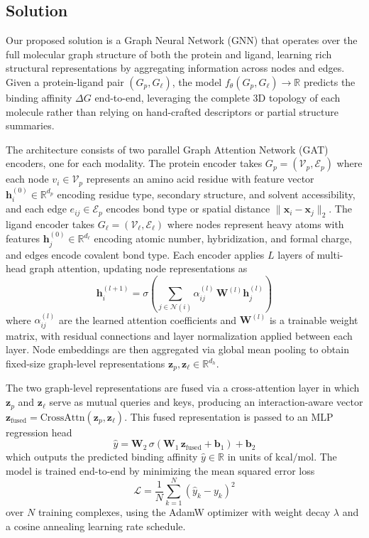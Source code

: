 \documentclass[conference]{IEEEtran}
\begin{document}
\subsection{Solution}\label{AA}
Our proposed solution is a Graph Neural Network (GNN) that operates over the full molecular graph structure of both the protein and ligand, learning rich structural representations by aggregating information across nodes and edges. Given a protein-ligand pair $(G_p, G_\ell)$, the model $f_\theta(G_p, G_\ell) \to \mathbb{R}$ predicts the binding affinity $\Delta G$ end-to-end, leveraging the complete 3D topology of each molecule rather than relying on hand-crafted descriptors or partial structure summaries.

The architecture consists of two parallel Graph Attention Network (GAT) encoders, one for each modality. The protein encoder takes $G_p = (\mathcal{V}_p, \mathcal{E}_p)$ where each node $v_i \in \mathcal{V}_p$ represents an amino acid residue with feature vector $\mathbf{h}_i^{(0)} \in \mathbb{R}^{d_p}$ encoding residue type, secondary structure, and solvent accessibility, and each edge $e_{ij} \in \mathcal{E}_p$ encodes bond type or spatial distance $\|\mathbf{x}_i - \mathbf{x}_j\|_2$. The ligand encoder takes $G_\ell = (\mathcal{V}_\ell, \mathcal{E}_\ell)$ where nodes represent heavy atoms with features $\mathbf{h}_j^{(0)} \in \mathbb{R}^{d_\ell}$ encoding atomic number, hybridization, and formal charge, and edges encode covalent bond type. Each encoder applies $L$ layers of multi-head graph attention, updating node representations as
\begin{equation}
    \mathbf{h}_i^{(l+1)} = \sigma\!\left(\sum_{j \in \mathcal{N}(i)} \alpha_{ij}^{(l)}\, \mathbf{W}^{(l)} \mathbf{h}_j^{(l)}\right)
\end{equation}
where $\alpha_{ij}^{(l)}$ are the learned attention coefficients and $\mathbf{W}^{(l)}$ is a trainable weight matrix, with residual connections and layer normalization applied between each layer. Node embeddings are then aggregated via global mean pooling to obtain fixed-size graph-level representations $\mathbf{z}_p, \mathbf{z}_\ell \in \mathbb{R}^{d_h}$.

The two graph-level representations are fused via a cross-attention layer in which $\mathbf{z}_p$ and $\mathbf{z}_\ell$ serve as mutual queries and keys, producing an interaction-aware vector $\mathbf{z}_{\text{fused}} = \text{CrossAttn}(\mathbf{z}_p, \mathbf{z}_\ell)$. This fused representation is passed to an MLP regression head
\begin{equation}
    \hat{y} = \mathbf{W}_2\, \sigma(\mathbf{W}_1\, \mathbf{z}_{\text{fused}} + \mathbf{b}_1) + \mathbf{b}_2
\end{equation}
which outputs the predicted binding affinity $\hat{y} \in \mathbb{R}$ in units of $\text{kcal/mol}$. The model is trained end-to-end by minimizing the mean squared error loss
\begin{equation}
    \mathcal{L} = \frac{1}{N}\sum_{k=1}^{N}\left(\hat{y}_k - y_k\right)^2
\end{equation}
over $N$ training complexes, using the AdamW optimizer with weight decay $\lambda$ and a cosine annealing learning rate schedule.
\end{document}
